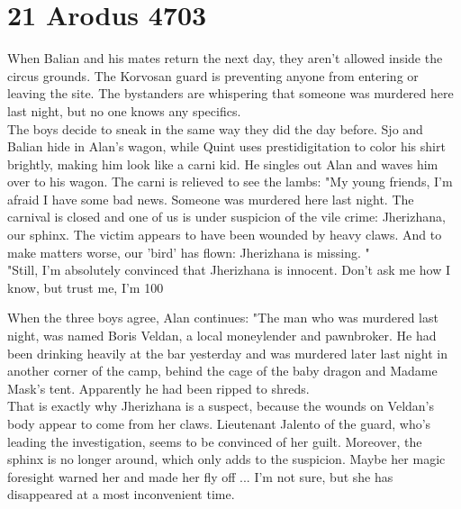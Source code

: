 \section{21 Arodus 4703}

When Balian and his mates return the next day, they aren't allowed inside the circus grounds. The Korvosan guard is preventing anyone from entering or leaving the site. The bystanders are whispering that someone was murdered here last night, but no one knows any specifics.\\

The boys decide to sneak in the same way they did the day before. Sjo and Balian hide in Alan's wagon, while Quint uses prestidigitation to color his shirt brightly, making him look like a carni kid. He singles out Alan and waves him over to his wagon. The carni is relieved to see the lambs: "My young friends, I'm afraid I have some bad news. Someone was murdered here last night. The carnival is closed and one of us is under suspicion of the vile crime: Jherizhana, our sphinx. The victim appears to have been wounded by heavy claws. And to make matters worse, our 'bird' has flown: Jherizhana is missing. "\\

"Still, I'm absolutely convinced that Jherizhana is innocent. Don't ask me how I know, but trust me, I'm 100 %

When the three boys agree, Alan continues: "The man who was murdered last night, was named Boris Veldan, a local moneylender and pawnbroker. He had been drinking heavily at the bar yesterday and was murdered later last night in another corner of the camp, behind the cage of the baby dragon and Madame Mask's tent. Apparently he had been ripped to shreds.\\

That is exactly why Jherizhana is a suspect, because the wounds on Veldan's body appear to come from her claws. Lieutenant Jalento of the guard, who's leading the investigation, seems to be convinced of her guilt. Moreover, the sphinx is no longer around, which only adds to the suspicion. Maybe her magic foresight warned her and made her fly off ... I'm not sure, but she has disappeared at a most inconvenient time.\\

